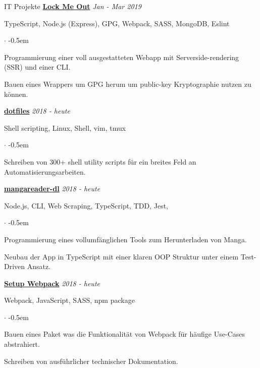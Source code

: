 \documentclass{cv}
\begin{document}
\begin{rSection}{IT Projekte}
  \textbf{\href{https://github.com/jneidel/lock-me-out}{Lock Me Out}}
  \hfill
  {\em Jan - Mar 2019}

  TypeScript, Node.js (Express), GPG, Webpack, SASS, MongoDB, Eslint
  \begin{list}{$\cdot$}{}
  \itemsep -0.5em \vspace{-0.5em}
    \smallskip
  \item Programmierung einer voll ausgestatteten Webapp mit Serverside-rendering (SSR) und einer CLI.
  \item Bauen eines Wrappers um GPG herum um public-key Kryptographie nutzen zu können.
  \end{list}

  \textbf{\href{https://github.com/jneidel/dotfiles}{dotfiles}}
  \hfill
  {\em 2018 - heute}

  Shell scripting, Linux, Shell, vim, tmux
  \begin{list}{$\cdot$}{}
  \itemsep -0.5em \vspace{-0.5em}
    \smallskip
  \item Schreiben von 300+ shell utility scripts für ein breites Feld an Automatisierungsarbeiten.
  \end{list}

  \textbf{\href{https://github.com/jneidel/mangareader-dl}{mangareader-dl}}
  \hfill
  {\em 2018 - heute}

  Node.js, CLI, Web Scraping, TypeScript, TDD, Jest,
  \begin{list}{$\cdot$}{}
  \itemsep -0.5em \vspace{-0.5em}
    \smallskip
  \item Programmierung eines vollumfänglichen Tools zum Herunterladen von Manga.
  \item Neubau der App in TypeScript mit einer klaren OOP Struktur unter einem Test-Driven Ansatz.
  \end{list}

  \textbf{\href{https://github.com/jneidel/setup-webpack}{Setup Webpack}}
  \hfill
  {\em 2018 - heute}

  Webpack, JavaScript, SASS, npm package
  \begin{list}{$\cdot$}{}
  \itemsep -0.5em \vspace{-0.5em}
    \smallskip
  \item Bauen eines Paket was die Funktionalität von Webpack für häufige Use-Cases abstrahiert.
  \item Schreiben von ausführlicher technischer Dokumentation.
  \end{list}

\end{rSection}
\end{document}
